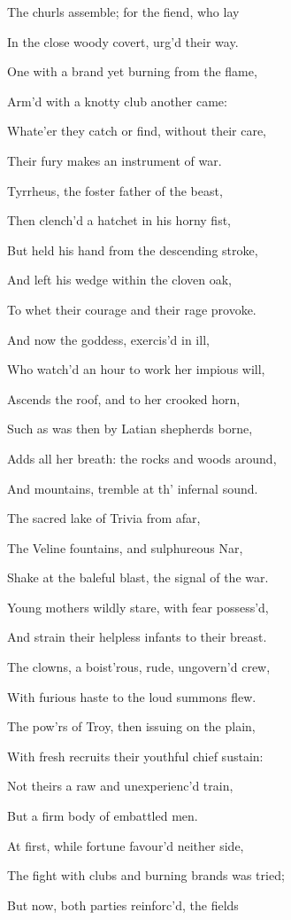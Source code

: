 The churls assemble; for the fiend, who lay

In the close woody covert, urg’d their way.

One with a brand yet burning from the flame,

Arm’d with a knotty club another came:

Whate’er they catch or find, without their care,

Their fury makes an instrument of war.

Tyrrheus, the foster father of the beast,

Then clench’d a hatchet in his horny fist,

But held his hand from the descending stroke,

And left his wedge within the cloven oak,

To whet their courage and their rage provoke.

And now the goddess, exercis’d in ill,

Who watch’d an hour to work her impious will,

Ascends the roof, and to her crooked horn,

Such as was then by Latian shepherds borne,

Adds all her breath: the rocks and woods around,

And mountains, tremble at th’ infernal sound.

The sacred lake of Trivia from afar,

The Veline fountains, and sulphureous Nar,

Shake at the baleful blast, the signal of the war.

Young mothers wildly stare, with fear possess’d,

And strain their helpless infants to their breast.

The clowns, a boist’rous, rude, ungovern’d crew,

With furious haste to the loud summons flew.

The pow’rs of Troy, then issuing on the plain,

With fresh recruits their youthful chief sustain:

Not theirs a raw and unexperienc’d train,

But a firm body of embattled men.

At first, while fortune favour’d neither side,

The fight with clubs and burning brands was tried;

But now, both parties reinforc’d, the fields

